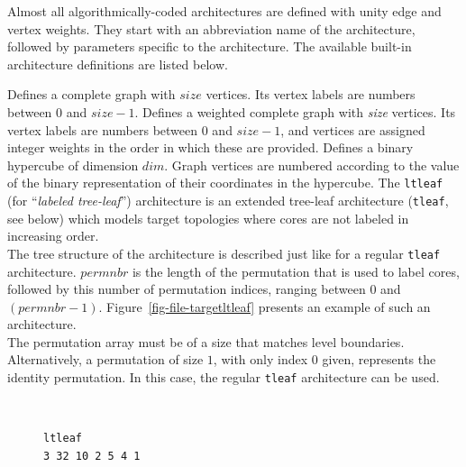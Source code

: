 Almost all algorithmically-coded architectures are defined with unity
edge and vertex weights. They start with an abbreviation name of the
architecture, followed by parameters specific to the architecture. The
available built-in architecture definitions are listed below.
\begin{itemize}
Defines a complete graph with $\mathit{size}$ vertices.
Its vertex labels are numbers between $0$ and $\mathit{size} - 1$.
Defines a weighted complete graph with {\it size\/} vertices.
Its vertex labels are numbers between $0$ and $\mathit{size} - 1$,
and vertices are assigned integer weights in the order in which
these are provided.
Defines a binary hypercube of dimension $\mathit{dim}$.
Graph vertices are numbered according to the value of the binary
representation of their coordinates in the hypercube.
\label{sec-file-target-ltleaf}
The \texttt{ltleaf} (for ``\textit{labeled tree-leaf}'') architecture is
an extended tree-leaf architecture (\texttt{tleaf}, see below) which
models target topologies where cores are not labeled in increasing
order.
\\
The tree structure of the architecture is described just like for a
regular \texttt{tleaf} architecture. $\mathit{permnbr}$ is the length
of the permutation that is used to label cores, followed by this
number of permutation indices, ranging between $0$ and
$(\mathit{permnbr}-1)$. Figure~\ref{fig-file-targetltleaf} presents an
example of such an architecture.
\\
The permutation array must be of a size that matches level
boundaries. Alternatively, a permutation of size $1$, with only index
$0$ given, represents the identity permutation. In this case, the
regular \texttt{tleaf} architecture can be used.
\begin{figure}[hbt]
\begin{center}
\begin{minipage}[b]{6cm}
{\renewcommand{\baselinestretch}{1.05}
\footnotesize\tt
\begin{verbatim}
ltleaf
3 32 10 2 5 4 1

\end{verbatim}}
\end{minipage}
\end{center}
\end{figure}
\end{itemize}
